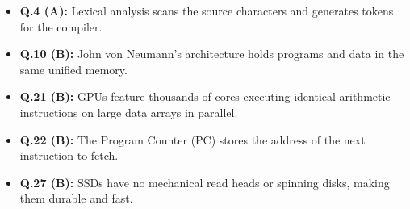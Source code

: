 \begin{expbox}
\begin{itemize}[leftmargin=5mm]
    \item \textbf{Q.4 (A):} Lexical analysis scans the source characters and generates tokens for the compiler.
    \item \textbf{Q.10 (B):} John von Neumann's architecture holds programs and data in the same unified memory.
    \item \textbf{Q.21 (B):} GPUs feature thousands of cores executing identical arithmetic instructions on large data arrays in parallel.
    \item \textbf{Q.22 (B):} The Program Counter (PC) stores the address of the next instruction to fetch.
    \item \textbf{Q.27 (B):} SSDs have no mechanical read heads or spinning disks, making them durable and fast.
\end{itemize}
\end{expbox}

\newpage
